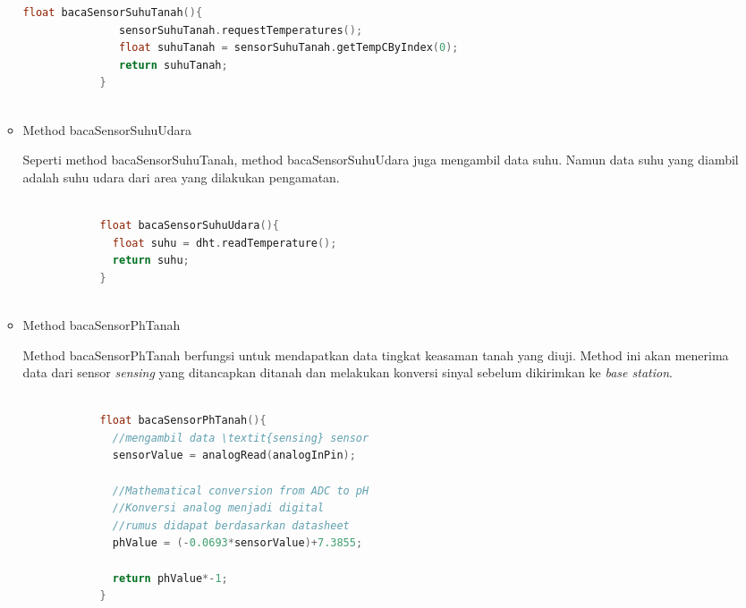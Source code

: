 \begin{itemize}
\begin{itemize}
\begin{lstlisting}[label=bacaSensorSuhuTanah, language=C, caption=Metode bacaSensorSuhuTanah(), numbers=none]
            float bacaSensorSuhuTanah(){
               sensorSuhuTanah.requestTemperatures();
               float suhuTanah = sensorSuhuTanah.getTempCByIndex(0);
               return suhuTanah;   
            }
            
            \end{lstlisting}
            
            \item Method bacaSensorSuhuUdara
            
            Seperti method bacaSensorSuhuTanah, method bacaSensorSuhuUdara juga mengambil data suhu. Namun data suhu yang diambil adalah suhu udara dari area yang dilakukan pengamatan.
            
            \begin{lstlisting}[label=bacaSensorSuhuUdara, language=C, caption=Metode bacaSensorSuhuUdara(), numbers=none]
            
            float bacaSensorSuhuUdara(){
              float suhu = dht.readTemperature();
              return suhu;
            }
            
            \end{lstlisting}
            
            \item Method bacaSensorPhTanah
            
            Method bacaSensorPhTanah berfungsi untuk mendapatkan data tingkat keasaman tanah yang diuji. Method ini akan menerima data dari sensor \textit{sensing} yang ditancapkan ditanah dan melakukan konversi sinyal sebelum dikirimkan ke \textit{base station}.
            
            \begin{lstlisting}[label=bacaSensorPhTanah, language=C, caption=Metode bacaSensorPhTanah(), numbers=none]
            
            float bacaSensorPhTanah(){
              //mengambil data \textit{sensing} sensor
              sensorValue = analogRead(analogInPin);
            
              //Mathematical conversion from ADC to pH
              //Konversi analog menjadi digital
              //rumus didapat berdasarkan datasheet 
              phValue = (-0.0693*sensorValue)+7.3855;
            
              return phValue*-1;
            }
            
            \end{lstlisting}
            

\end{itemize}
\end{itemize}
